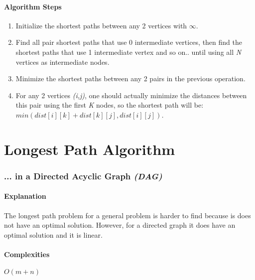 \documentclass[]{article}
\begin{document}
	\subsection{Algorithm Steps}
	\begin{enumerate}
		\item Initialize the shortest paths between any 2 vertices with $\infty$.
		\item Find all pair shortest paths that use 0 intermediate vertices, then find the shortest paths that use 1 intermediate vertex and so on.. until using all \textit{N} vertices as intermediate nodes.
		\item Minimize the shortest paths between any 2 pairs in the previous operation.
		\item For any 2 vertices \textit{(i,j)}, one should actually minimize the distances between this pair using the first \textit{K} nodes, so the shortest path will be: \textit{$min(dist[i][k]+dist[k][j],dist[i][j])$.}
	\end{enumerate}

\part{Longest Path Algorithm}

\section{... in a Directed Acyclic Graph \textit{(DAG)} }
	\subsection{Explanation}
	\par The longest path problem for a general problem is harder to find because is does not have an optimal solution. However, for a directed graph it does have an optimal solution and it is linear.
	
	\subsection{Complexities}
	\par $O(m + n)$
	
\end{document}
